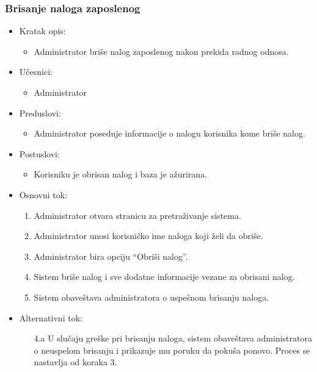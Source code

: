 \subsubsection{Brisanje naloga zaposlenog}

\begin{itemize}
    \item Kratak opis:
        \begin{itemize}
            \item Administrator briše nalog zaposlenog nakon prekida radnog odnosa.
        \end{itemize}
    \item Učesnici:
        \begin{itemize}
            \item Administrator
        \end{itemize}
    \item Preduslovi:
        \begin{itemize}
            \item Administrator poseduje informacije o nalogu korisnika kome briše nalog.
        \end{itemize}
    \item Postuslovi:
        \begin{itemize}
            \item Korisniku je obrisan nalog i baza je ažurirana.
        \end{itemize}
    \item Osnovni tok:
        \begin{enumerate}
         \item Administrator otvara stranicu za pretraživanje sistema.
         \item Administrator unosi korisničko ime naloga koji želi da obriše.
         \item Administrator bira opciju ``Obriši nalog''.
         \item Sistem briše nalog i sve dodatne informacije vezane za obrisani nalog.
         \item Sistem obaveštava administratora o uspešnom brisanju naloga.
        \end{enumerate}
    \item Alternativni tok:
        \begin{itemize}
            \item[4.a] U slučaju greške pri brisanju naloga, sistem obaveštava administratora o neuspelom brisanju i prikazuje mu poruku da pokuša ponovo. Proces se nastavlja od koraka 3.
        \end{itemize}
\end{itemize}

